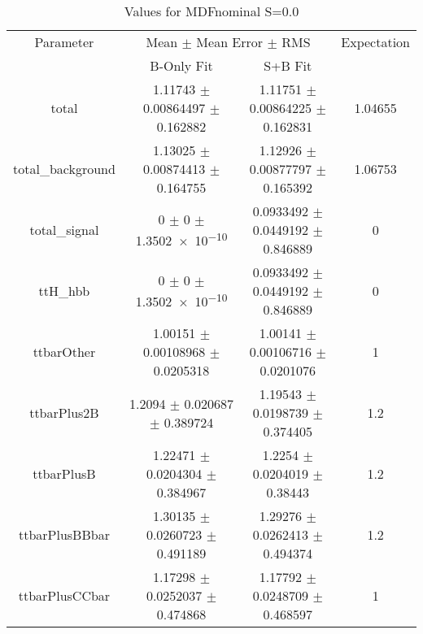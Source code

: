 \begin{table}
\centering
\caption{Values for MDFnominal S=0.0}
\begin{tabular}{cccc}
\toprule
Parameter & \multicolumn{2}{c}{Mean $\pm$ Mean Error $\pm$ RMS} & Expectation\\
 & B-Only Fit & S+B Fit & \\
\midrule
total & \num{1.11743} $\pm$ \num{0.00864497} $\pm$ \num{0.162882} & \num{1.11751} $\pm$ \num{0.00864225} $\pm$ \num{0.162831} & \num{1.04655}\\
total\_background & \num{1.13025} $\pm$ \num{0.00874413} $\pm$ \num{0.164755} & \num{1.12926} $\pm$ \num{0.00877797} $\pm$ \num{0.165392} & \num{1.06753}\\
total\_signal & \num{0} $\pm$ \num{0} $\pm$ \num{1.3502e-10} & \num{0.0933492} $\pm$ \num{0.0449192} $\pm$ \num{0.846889} & \num{0}\\
ttH\_hbb & \num{0} $\pm$ \num{0} $\pm$ \num{1.3502e-10} & \num{0.0933492} $\pm$ \num{0.0449192} $\pm$ \num{0.846889} & \num{0}\\
ttbarOther & \num{1.00151} $\pm$ \num{0.00108968} $\pm$ \num{0.0205318} & \num{1.00141} $\pm$ \num{0.00106716} $\pm$ \num{0.0201076} & \num{1}\\
ttbarPlus2B & \num{1.2094} $\pm$ \num{0.020687} $\pm$ \num{0.389724} & \num{1.19543} $\pm$ \num{0.0198739} $\pm$ \num{0.374405} & \num{1.2}\\
ttbarPlusB & \num{1.22471} $\pm$ \num{0.0204304} $\pm$ \num{0.384967} & \num{1.2254} $\pm$ \num{0.0204019} $\pm$ \num{0.38443} & \num{1.2}\\
ttbarPlusBBbar & \num{1.30135} $\pm$ \num{0.0260723} $\pm$ \num{0.491189} & \num{1.29276} $\pm$ \num{0.0262413} $\pm$ \num{0.494374} & \num{1.2}\\
ttbarPlusCCbar & \num{1.17298} $\pm$ \num{0.0252037} $\pm$ \num{0.474868} & \num{1.17792} $\pm$ \num{0.0248709} $\pm$ \num{0.468597} & \num{1}\\
\bottomrule
\end{tabular}
\end{table}
